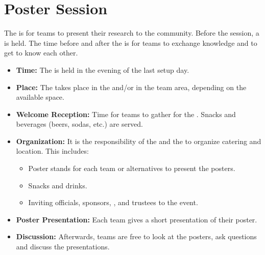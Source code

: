 \section{Poster Session}
\label{sec:setupdays:postersession}
The \PS{} is for teams to present their research to the \AtHome{} community. Before the session, a \WelcomeReception{} is held. The time before and after the \PS{} is for teams to exchange knowledge and to get to know each other.
\begin{itemize}
	\item \textbf{Time:} The \PS{} is held in the evening of the last setup day.
	\item \textbf{Place:} The \PS{} takes place in the \Arena{} and/or in the team area, depending on the available space.
	\item \textbf{Welcome Reception:} Time for teams to gather for the \PS{}. Snacks and beverages (beers, sodas, etc.) are served.
	\item \textbf{Organization:} It is the responsibility of the  and the  to organize catering and location. This includes:
		\begin{itemize}
			\item Poster stands for each team or alternatives to present the posters.
			\item Snacks and drinks.
			\item Inviting officials, sponsors, , and \RCF{} trustees to the event.
		\end{itemize}
	\item \textbf{Poster Presentation:} Each team gives a short presentation of their poster.
	\item \textbf{Discussion:} Afterwards, teams are free to look at the posters, ask questions and discuss the presentations.
\end{itemize}

